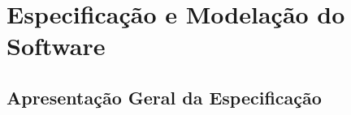 
\newcommand{\headercaso}[5]{
    \subsubsection{#1}
    \textbf{Descrição:}
    \begin{itemize}
        \item[] #2
    \end{itemize}

    \textbf{Condições:}
    \begin{itemize}
        \item[] \textbf{(Pre)} #3
        \item[] \textbf{(Pos)} #4
    \end{itemize}
}


\newcommand{\normal}[2]{
  \textbf{#1} %
  \begin{enumerate}[label=\arabic*.] %
    \foreach \x in {#2} {
      \item \x %
    }
  \end{enumerate}
}

\newcommand{\alt}[3]{
  \textbf{#1 - no passo #2:} %
  \begin{enumerate}[label=\arabic*.\arabic*] %
    \foreach \x [count=\i] in {#3} {%
      \item[\the\numexpr#2.\i\relax.] \x %
    }
  \end{enumerate}
}


\chapter{Especificação e Modelação do Software}

    \section{Apresentação Geral da Especificação}

